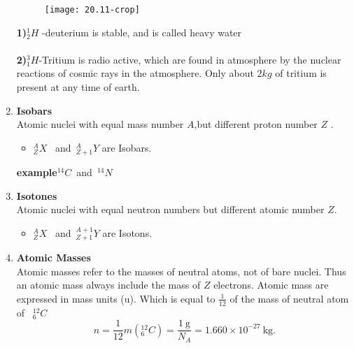 \begin{enumerate}
\begin{figure}[H]
	\centering
	\texttt{[image: 20.11-crop]}
\end{figure}
\begin{note}
	\textbf{1)}\quad $^1_2 H$ -\quad deuterium is stable, and is called heavy water\\\\
		\textbf{2)}\quad $^3_1H$-Tritium is radio active, which are found in atmosphere by the nuclear reactions of cosmic rays in the atmosphere.  Only about $2kg$ of tritium is present at any time of earth.
\end{note}
\item  \textbf{Isobars}\\
Atomic nuclei with equal mass number $A$,but different proton number $Z$ .
\begin{itemize}
	\item $^A_Z X$ \  and\ $^A_{Z+1} Y$ are Isobars.
\end{itemize}
\textbf{example}\quad $^{14}C$\  and\  $^{14} N$
\item  \textbf{Isotones}\\
Atomic nuclei with equal neutron numbers but different atomic number $Z$.
\begin{itemize}
	\item $^A_Z X$ \  and\ $^{A+1}_{Z+1} Y$ are Isotons.
\end{itemize}
\item  \textbf{Atomic Masses}\\
Atomic masses refer to the masses of neutral atoms, not of bare nuclei. Thus an atomic mass always include the mass of $Z$ electrons. Atomic mass are expressed in mass units (u). Which is equal to $\frac{1}{12}$ of the mass of neutral atom of \ $^{12}_6 C$\\
$$n=\frac{1}{12} m\left({ }{^{12}_6C}\right)=\frac{1 \mathrm{~g}}{N_{A}}=1.660 \times 10^{-27} \mathrm{~kg} .$$
\begin{center}
	\framebox{
		\parbox[t][0.5cm]{3.5cm}{
			
			\addvspace{-0.5cm} \centering
			
}}
\end{center}
\end{enumerate}
